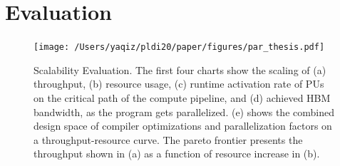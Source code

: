 \section{Evaluation} \label{sec:eval}

\begin{figure}
\centering
\texttt{[image: /Users/yaqiz/pldi20/paper/figures/par\_thesis.pdf]}
\caption[Scalability Evaluation]{
  Scalability Evaluation. 
  The first four charts show the scaling of
  (a) throughput, 
  (b) resource usage, 
  (c) runtime activation rate of PUs on the critical path of the compute pipeline, 
  and (d) achieved HBM bandwidth, as the program gets parallelized.
  (e) shows the combined design space of compiler optimizations and parallelization factors on a
  throughput-resource curve. 
  The pareto frontier presents the throughput shown in (a) as a function of resource increase in
  (b).
}
\label{fig:par}
\end{figure}



